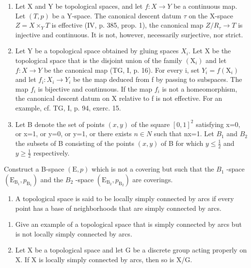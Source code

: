 \exercisegroup

\begin{enumerate}
\def\labelenumi{\arabic{enumi})}
\item
  Let X and Y be topological spaces, and let \(f: X \to Y\) be a continuous map. Let \((T, p)\) be a Y-space. The canonical descent datum \(\tau\) on the X-space \(Z = X \times_{Y} T\) is effective (IV, p. 385, prop. 1), the canonical map \(Z/R_{\tau} \to T\) is injective and continuous. It is not, however, necessarily surjective, nor strict.
\item
  Let Y be a topological space obtained by gluing spaces \(X_{i}\). Let X be the topological space that is the disjoint union of the family \((\mathrm{X}_{i})\) and let \(f: X \to Y\) be the canonical map (TG, I, p. 16). For every i, set \(Y_{i} = f(\mathrm{X}_{i})\) and let \(f_{i}: X_{i} \to Y_{i}\) be the map deduced from f by passing to subspaces. The map \(f_{i}\) is bijective and continuous. If the map \(f_{i}\) is not a homeomorphism, the canonical descent datum on X relative to f is not effective. For an example, cf. TG, I, p. 94, exerc. 15.
\item
  Let B denote the set of points \((x,y)\) of the square \([0,1]^{2}\) satisfying x=0, or x=1, or y=0, or y=1, or there exists \(n\in N\) such that nx=1. Let \(B_{1}\) and \(B_{2}\) the subsets of B consisting of the points \((x,y)\) of B for which \(y\leqslant\frac{1}{2}\) and \(y\geqslant\frac{1}{2}\) respectively.
\end{enumerate}

Construct a B-space \((\mathrm{E}, p)\) which is not a covering but such that the \(B_{1}\) -space \((\mathrm{E}_{\mathrm{B}_{1}}, p_{\mathrm{B}_{1}})\) and the \(B_{2}\) -space \((\mathrm{E}_{\mathrm{B}_{2}}, p_{\mathrm{B}_{2}})\) are coverings.

\begin{enumerate}
\def\labelenumi{\arabic{enumi})}
\setcounter{enumi}{3}
\tightlist
\item
  A topological space is said to be locally simply connected by arcs if every point has a base of neighborhoods that are simply connected by arcs.
\end{enumerate}

\begin{enumerate}
\def\labelenumi{\alph{enumi})}
\item
  Give an example of a topological space that is simply connected by arcs but is not locally simply connected by arcs.
\item
  Let X be a topological space and let G be a discrete group acting properly on X. If X is locally simply connected by arcs, then so is X/G.
\end{enumerate}

